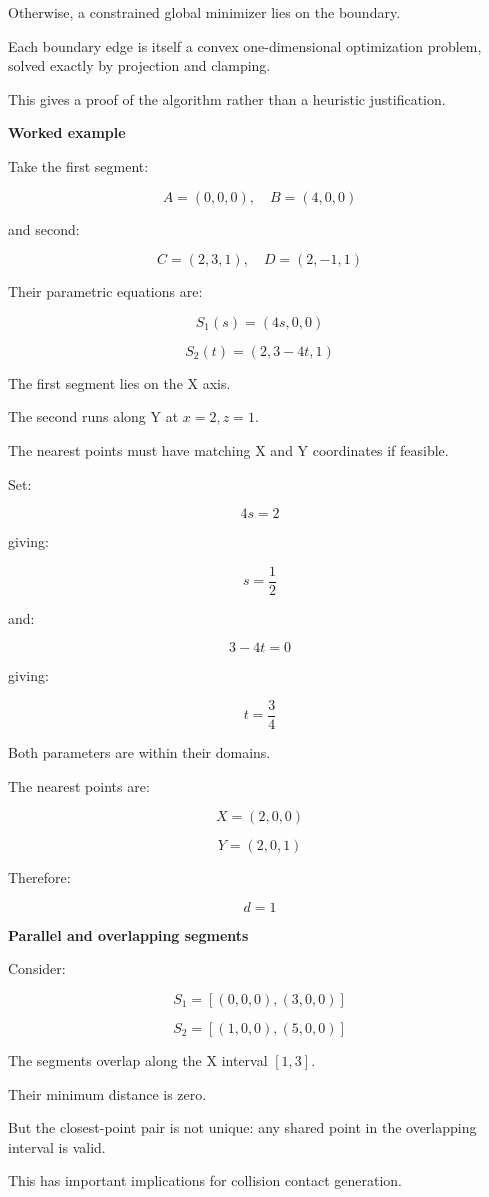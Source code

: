 Otherwise, a constrained global minimizer lies on the boundary.

Each boundary edge is itself a convex one-dimensional optimization problem, solved exactly by projection and clamping.

This gives a proof of the algorithm rather than a heuristic justification.

\textbf{Worked example}

Take the first segment:

\[
A=(0,0,0),\quad B=(4,0,0)
\]

and second:

\[
C=(2,3,1),\quad D=(2,-1,1)
\]

Their parametric equations are:

\[
S_1(s)=(4s,0,0)
\]

\[
S_2(t)=(2,3-4t,1)
\]

The first segment lies on the X axis.

The second runs along Y at \(x=2,z=1\).

The nearest points must have matching X and Y coordinates if feasible.

Set:

\[
4s=2
\]

giving:

\[
s=\frac12
\]

and:

\[
3-4t=0
\]

giving:

\[
t=\frac34
\]

Both parameters are within their domains.

The nearest points are:

\[
X=(2,0,0)
\]

\[
Y=(2,0,1)
\]

Therefore:

\[
\boxed{d=1}
\]

\textbf{Parallel and overlapping segments}

Consider:

\[
S_1=[(0,0,0),(3,0,0)]
\]

\[
S_2=[(1,0,0),(5,0,0)]
\]

The segments overlap along the X interval \([1,3]\).

Their minimum distance is zero.

But the closest-point pair is not unique: any shared point in the overlapping interval is valid.

This has important implications for collision contact generation.

